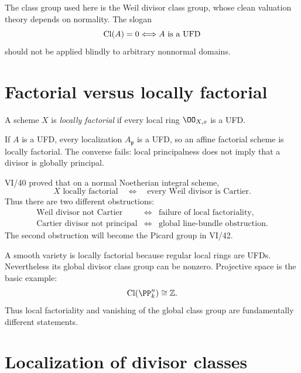 \begin{warning}
The class group used here is the Weil divisor class group, whose clean valuation theory depends on normality. The slogan
\[
  \operatorname{Cl}(A)=0\Longleftrightarrow A\text{ is a UFD}
\]
should not be applied blindly to arbitrary nonnormal domains.
\end{warning}



\section{Factorial versus locally factorial}

\begin{definition}\label{def:vi41-locally-factorial}
A scheme \(X\) is \emph{locally factorial} if every local ring \(\OO_{X,x}\) is a UFD.
\end{definition}

If \(A\) is a UFD, every localization \(A_{\mathfrak p}\) is a UFD, so an affine factorial scheme is locally factorial. The converse fails: local principalness does not imply that a divisor is globally principal.

VI/40 proved that on a normal Noetherian integral scheme,
\[
  X\text{ locally factorial}
  \quad\Longleftrightarrow\quad
  \text{every Weil divisor is Cartier}.
\]
Thus there are two different obstructions:
\[
\begin{array}{ccl}
\text{Weil divisor not Cartier}
&\Longleftrightarrow&
\text{failure of local factoriality},\\[3pt]
\text{Cartier divisor not principal}
&\Longleftrightarrow&
\text{global line-bundle obstruction}.
\end{array}
\]
The second obstruction will become the Picard group in VI/42.

\begin{example}\label{ex:vi41-smooth-not-global}
A smooth variety is locally factorial because regular local rings are UFDs. Nevertheless its global divisor class group can be nonzero. Projective space is the basic example:
\[
  \Cl(\PP^n_k)\cong\mathbb Z.
\]
Thus local factoriality and vanishing of the global class group are fundamentally different statements.
\end{example}

\section{Localization of divisor classes}

